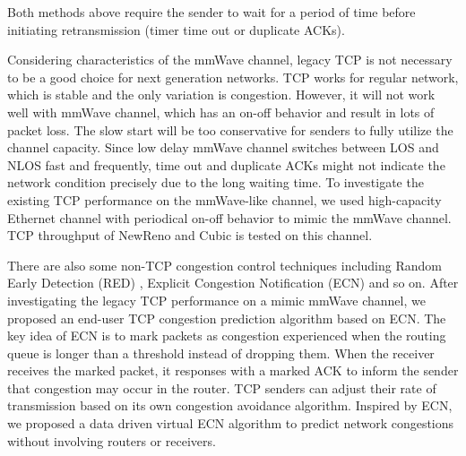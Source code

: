 Both methods above require the sender to wait for a period of time before initiating retransmission (timer time out or duplicate ACKs). 
\par Considering characteristics of the mmWave channel, legacy TCP is not necessary to be a good choice for next generation networks. TCP works for regular network, which is stable and the only variation is congestion. However, it will not work well with mmWave channel, which has an on-off behavior and result in lots of packet loss. The slow start will be too conservative for senders to fully utilize the channel capacity. Since low delay mmWave channel switches between LOS and NLOS fast and frequently, time out and duplicate ACKs might not indicate the network condition precisely due to the long waiting time. To investigate the existing TCP performance on the mmWave-like channel, we used high-capacity Ethernet channel with periodical on-off behavior to mimic the mmWave channel. TCP throughput of NewReno and Cubic \cite{grieco2004performance, ha2008cubic} is tested on this channel. 
\par There are also some non-TCP congestion control techniques including Random Early Detection (RED) \cite{lin1997dynamics}, Explicit Congestion Notification (ECN) \cite{ramakrishnan2001rfc} and so on. After investigating the legacy TCP performance on a mimic mmWave channel, we proposed an end-user TCP congestion prediction algorithm based on ECN. The key idea of ECN is to mark packets as congestion experienced when the routing queue is longer than a threshold instead of dropping them. When the receiver receives the marked packet, it responses with a marked ACK to inform the sender that congestion may occur in the router. TCP senders can adjust their rate of transmission based on its own congestion avoidance algorithm. Inspired by ECN, we proposed a data driven virtual ECN algorithm to predict network congestions without involving routers or receivers.
